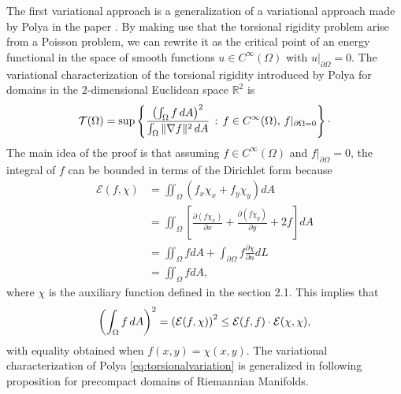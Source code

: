 \documentclass{amsart}
\theoremstyle{definition}
\theoremstyle{remark}
\begin{document}
The first variational approach is a generalization of a variational approach made by Polya in the paper \cite{Polya_Variational}. By making use that the torsional rigidity problem arise from a Poisson problem, we can rewrite it as the critical point of an energy functional in the space of smooth functions $u\in C^\infty(\Omega)$ with $u\big|_{\partial \Omega}=0$. The variational characterization of the torsional rigidity introduced by Polya for domains in the $2$-dimensional Euclidean space $\mathbb{R}^2$ is
\begin{equation}\label{eq:torsionalvariation}
     \mathcal{T}(\Omega)= \sup \left\{ \frac{\left(\int_\Omega  f\, { d} {\rm A}\right)^2}{\int_\Omega \Vert \nabla f\Vert^2\, { d}{\rm A}} \, :\, f\in C^\infty(\Omega),\, f|_{\partial\Omega = 0}\right\}\cdot
\end{equation}
The main idea of the proof is that assuming  $f\in C^\infty(\Omega)$ and $f\big|_{\partial \Omega}=0$, the integral of $f$ can be bounded in terms of  the Dirichlet form because  
\begin{equation*}
    \begin{aligned}
        \mathcal{E}(f, \chi) & =\iint_\Omega\left(f_x \chi_x+f_y \chi_y\right) d A \\
        & =\iint_\Omega\left[\frac{\partial\left(f \chi_x\right)}{\partial x}+\frac{\partial\left(f \chi_y\right)}{\partial y}+2 f\right] dA \\
        & = \iint_\Omega f dA+\int_{\partial \Omega} f \frac{\partial \chi}{\partial n} dL \\
        & = \iint_\Omega f d A,
        \end{aligned}
\end{equation*}
where $\chi$ is the auxiliary function defined in the section 2.1. This implies that
$$
\left(\int_\Omega  f\, { d}{\rm A}\right)^2=\left(\mathcal{E}(f,\chi)\right)^2\leq \mathcal{E}(f,f)\cdot \mathcal{E}(\chi,\chi),
$$
with equality obtained when $f(x,y) = \chi(x,y)$. The variational characterization of Polya \eqref{eq:torsionalvariation} is generalized in  following proposition  for precompact domains of Riemannian Manifolds.
\end{document}
